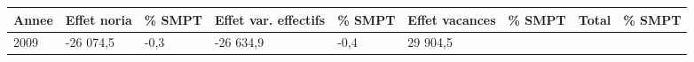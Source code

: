 \begin{longtable}[]{@{}lllllllll@{}}
\toprule
\begin{minipage}[b]{0.05\columnwidth}\raggedright
Annee\strut
\end{minipage} & \begin{minipage}[b]{0.10\columnwidth}\raggedright
Effet noria\strut
\end{minipage} & \begin{minipage}[b]{0.06\columnwidth}\raggedright
\% SMPT\strut
\end{minipage} & \begin{minipage}[b]{0.16\columnwidth}\raggedright
Effet var. effectifs\strut
\end{minipage} & \begin{minipage}[b]{0.06\columnwidth}\raggedright
\% SMPT\strut
\end{minipage} & \begin{minipage}[b]{0.12\columnwidth}\raggedright
Effet vacances\strut
\end{minipage} & \begin{minipage}[b]{0.06\columnwidth}\raggedright
\% SMPT\strut
\end{minipage} & \begin{minipage}[b]{0.09\columnwidth}\raggedright
Total\strut
\end{minipage} & \begin{minipage}[b]{0.06\columnwidth}\raggedright
\% SMPT\strut
\end{minipage}\tabularnewline
\midrule
\endhead
\begin{minipage}[t]{0.05\columnwidth}\raggedright
2009\strut
\end{minipage} & \begin{minipage}[t]{0.10\columnwidth}\raggedright
-26 074,5\strut
\end{minipage} & \begin{minipage}[t]{0.06\columnwidth}\raggedright
-0,3\strut
\end{minipage} & \begin{minipage}[t]{0.16\columnwidth}\raggedright
-26 634,9\strut
\end{minipage} & \begin{minipage}[t]{0.06\columnwidth}\raggedright
-0,4\strut
\end{minipage} & \begin{minipage}[t]{0.12\columnwidth}\raggedright
29 904,5\strut
\end{minipage} & \begin{minipage}[t]{0.06\columnwidth}\raggedright

\end{minipage}
\end{longtable}
